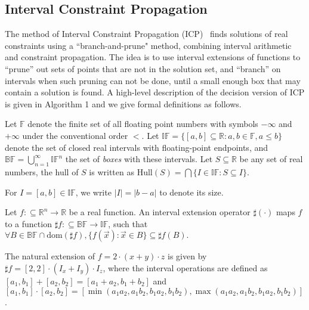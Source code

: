 \documentclass[envcountsect]{llncs}
\newcommand{\dom}{\mathrm{dom}}
\begin{document}
\subsection{Interval Constraint Propagation}

The method of Interval Constraint Propagation (ICP)~\cite{handbookICP} finds solutions of real constraints using a ``branch-and-prune" method, combining interval arithmetic and constraint propagation. The idea is to use interval extensions of functions to ``prune'' out sets of points that are not in the solution set, and ``branch'' on intervals when such pruning can not be done, until a small enough box that may contain a solution is found. A high-level description of the decision version of ICP is given in Algorithm 1 and we give formal definitions as follows.

\begin{definition}
Let $\mathbb{F}$ denote the finite set of all floating point numbers with symbols $-\infty$ and $+\infty$ under the conventional order $<$. Let
$\mathbb{IF} = \{[a,b]\subseteq \mathbb{R}: a,b\in \mathbb{F}, a\leq b\}$ denote the set of closed real intervals with floating-point endpoints, and $\mathbb{BF} = \bigcup_{n=1}^{\infty}\mathbb{IF}^n$ the set of {\em boxes} with these intervals. Let $S\subseteq \mathbb{R}$ be any set of real numbers, the hull of $S$ is written as $\mathrm{Hull}(S) = \bigcap \{I\in \mathbb{IF}: S\subseteq I\}.$
\end{definition}

For $I= [a, b]\in \mathbb{IF}$, we write $|I| = |b-a|$ to denote its size. 


\begin{definition}
Let $f:\subseteq\mathbb{R}^n\rightarrow \mathbb{R}$ be a real function. An interval extension operator $\sharp(\cdot)$ maps $f$ to a function $\sharp f:\subseteq \mathbb{BF}\rightarrow \mathbb{IF}$, such that 
$\forall B\in\mathbb{BF}\cap \dom(\sharp f), \{f(\vec x):\vec x\in B\}\subseteq \sharp f(B).$
\end{definition}
\begin{example}
The natural extension of $f = 2\cdot(x+y)\cdot z$ is given by $\sharp f = [2,2]\cdot(I_x+I_y)\cdot I_z$, where the interval operations are defined as $[a_1,b_1]+[a_2, b_2] = [a_1+a_2, b_1+b_2]$ and $[a_1,b_1]\cdot[a_2,b_2] = [\min(a_1a_2,a_1b_2,b_1a_2,b_1b_2), \max(a_1a_2,a_1b_2,b_1a_2,b_1b_2)]$. 
\end{example}
\end{document}
